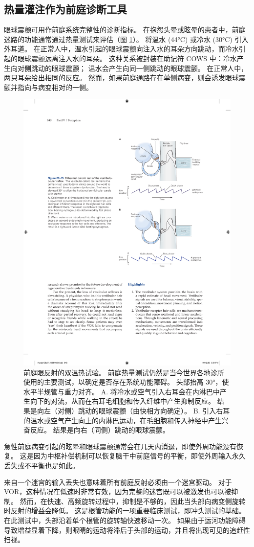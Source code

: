 \subsection{热量灌注作为前庭诊断工具}
眼球震颤可用作前庭系统完整性的诊断指标。 在抱怨头晕或眩晕的患者中，前庭迷路的功能通常通过热量测试来评估（图 \ref{fig:27_15}）。 
将温水 (44°C) 或冷水 (30°C) 引入外耳道。 在正常人中，温水引起的眼球震颤向注入水的耳朵方向跳动，而冷水引起的眼球震颤远离注入水的耳朵。 这种关系被封装在助记符 COWS 中：冷水产生向对侧跳动的眼球震颤； 温水会产生向同一侧跳动的眼球震颤。 在正常人中，两只耳朵给出相同的反应。 然而，如果前庭通路存在单侧病变，则会诱发眼球震颤并指向与病变相对的一侧。

\begin{figure}[htbp]
	\centering
	\includegraphics[width=0.6\linewidth]{chap27/fig_27_15}
	\caption{前庭眼反射的双温热试验。 前庭热量测试仍然是当今世界各地诊所使用的主要测试，以确定是否存在系统功能障碍。 头部抬高 30°，使水平半规管与重力对齐。 A. 将冷水或空气引入右耳会在内淋巴中产生向下的对流，从而在右耳毛细胞和传入纤维中产生抑制反应。 结果是向左（对侧）跳动的眼球震颤（由快相方向确定）。 B. 引入右耳的温水或空气产生向上的内淋巴运动，在毛细胞和传入神经中产生兴奋反应。 结果是向右（同侧）跳动的眼球震颤。}
	\label{fig:27_15}
\end{figure}

急性前庭病变引起的眩晕和眼球震颤通常会在几天内消退，即使外周功能没有恢复。 这是因为中枢补偿机制可以恢复脑干中前庭信号的平衡，即使外周输入永久丢失或不平衡也是如此。

来自一个迷宫的输入丢失也意味着所有前庭反射必须由一个迷宫驱动。 对于 VOR，这种情况在低速时非常有效，因为完整的迷宫既可以被激发也可以被抑制。 然而，在快速、高频旋转过程中，抑制是不够的，因此当头部向病变侧旋转时反射的增益会降低。 这是根管功能的一项重要临床测试，即冲头测试的基础。 在此测试中，头部沿着单个根管的旋转轴快速移动一次。 如果由于运河功能障碍导致增益显着下降，则眼睛的运动将滞后于头部的运动，并且将出现可见的追赶性扫视。



